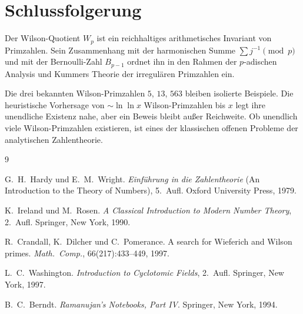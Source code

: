 \documentclass[12pt,a4paper]{amsart}
\theoremstyle{definition}
\begin{document}
\section{Schlussfolgerung}

Der Wilson-Quotient $W_p$ ist ein reichhaltiges arithmetisches Invariant
von Primzahlen. Sein Zusammenhang mit der harmonischen Summe
$\sum j^{-1} \pmod{p}$ und mit der Bernoulli-Zahl $B_{p-1}$ ordnet ihn in
den Rahmen der $p$-adischen Analysis und Kummers Theorie der irregulären
Primzahlen ein.

Die drei bekannten Wilson-Primzahlen $5$, $13$, $563$ bleiben isolierte
Beispiele. Die heuristische Vorhersage von $\sim \ln\ln x$ Wilson-Primzahlen
bis $x$ legt ihre unendliche Existenz nahe, aber ein Beweis bleibt außer
Reichweite. Ob unendlich viele Wilson-Primzahlen existieren, ist eines der
klassischen offenen Probleme der analytischen Zahlentheorie.

\begin{thebibliography}{9}

G.~H.~Hardy und E.~M.~Wright.
\newblock \emph{Einführung in die Zahlentheorie} (An Introduction to the Theory of Numbers), 5.~Aufl.
\newblock Oxford University Press, 1979.

K.~Ireland und M.~Rosen.
\newblock \emph{A Classical Introduction to Modern Number Theory}, 2.~Aufl.
\newblock Springer, New York, 1990.

R.~Crandall, K.~Dilcher und C.~Pomerance.
\newblock A search for Wieferich and Wilson primes.
\newblock \emph{Math.\ Comp.}, 66(217):433--449, 1997.

L.~C.~Washington.
\newblock \emph{Introduction to Cyclotomic Fields}, 2.~Aufl.
\newblock Springer, New York, 1997.

B.~C.~Berndt.
\newblock \emph{Ramanujan's Notebooks, Part IV}.
\newblock Springer, New York, 1994.

\end{thebibliography}
\end{document}
